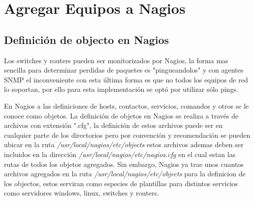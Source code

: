 \documentclass[12pt]{book}
\begin{document}
    \section{Agregar Equipos a Nagios}
    \subsection{ Definición de objecto en Nagios}
    Los switches y routers pueden ser monitorizados por Nagios, la forma mas sencilla para determinar perdidas de paquetes es "pingueandolos" y con agentes
    SNMP el inconveniente con esta última forma es que no todos los equipos de red lo soportan, por ello para esta implementación se optó por utilizar sólo 
    pings.

    En Nagios a las definiciones de hosts, contactos, servicios, comandos y otros se le conoce como objetos.
    La definición de objetos en Nagios se realiza a través de archivos con extensión ".cfg", la definición de estos archivos puede ser en cualquier parte de 
    los directorios pero por convención y recomendación se pueden ubicar en la ruta {\itshape /usr/local/nagios/etc/objects } estos archivos ademas deben ser
    incluidos en la dirección {\itshape /usr/local/nagios/etc/nagios.cfg } en el cual estan las rutas de todos los objetos agregados.
    Sin embargo, Nagios ya trae unos cuantos archivos agregados en la ruta {\itshape /usr/local/nagios/etc/objects } para la definicion de los objectos, estos
    serviran como especies de plantillas para distintos servicios como servidores windows, linux, switches y routers.
\end{document}
